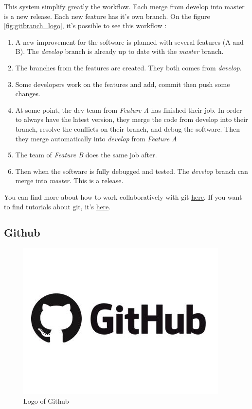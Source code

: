 \documentclass[a4paper]{report}
\begin{document}
This system simplify greatly the workflow. Each merge from develop into master is a new release. Each new feature has it's own branch. On the figure \ref{fig:gitbranch_logo}, it's possible to see this workflow : 
\begin{enumerate}
	\item A new improvement for the software is planned with several features (A and B). The \textit{develop} branch is already up to date with the \textit{master} branch.
    \item The branches from the features are created. They both comes from \textit{develop}.
    \item Some developers work on the features and add, commit then push some changes.
    \item At some point, the dev team from \textit{Feature A} has finished their job. In order to always have the latest version, they merge the code from develop into their branch, resolve the conflicts on their branch, and debug the software. Then they merge automatically into \textit{develop} from \textit{Feature A}
    \item The team of \textit{Feature B} does the same job after.
    \item Then when the software is fully debugged and tested. The \textit{develop} branch can merge into \textit{master}. This is a release. 
\end{enumerate}

You can find more about how to work collaboratively with git \href{https://www.atlassian.com/git/tutorials/comparing-workflows}{here}. If you want to find tutorials about git, it's \href{https://openclassrooms.com/courses/gerez-vos-codes-source-avec-git}{here}.

\subsection{Github}

\begin{figure}[H]
	\centering
	\includegraphics[width=0.4\linewidth]{image/github.jpg}
	\caption{Logo of Github}
	\label{fig:github_logo}
\end{figure}
\end{document}
